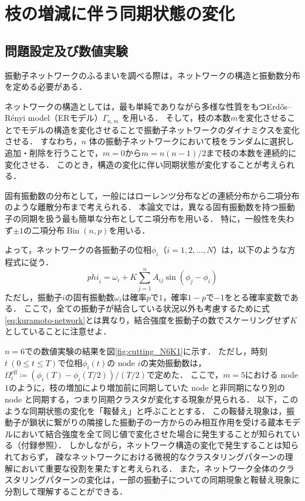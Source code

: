 \documentclass[../main]{subfiles}
\begin{document}
\chapter{枝の増減に伴う同期状態の変化}
\label{chap:method-3body}
\section{問題設定及び数値実験}
\label{sec:method-3body-settting}
振動子ネットワークのふるまいを調べる際は，ネットワークの構造と振動数分布を定める必要がある．

ネットワークの構造としては，最も単純でありながら多様な性質をもつErd\H{o}s–R\'{e}nyi model（ERモデル）$\Gamma_{n,m}$ を用いる．
そして，枝の本数$m$を変化させることでモデルの構造を変化させることで振動子ネットワークのダイナミクスを変化させる．
すなわち，$n$ 体の振動子ネットワークにおいて枝をランダムに選択し追加・削除を行うことで，$m=0$から$m=n(n-1)/2$まで枝の本数を連続的に変化させる．
このとき，構造の変化に伴い同期状態が変化することが考えられる．

固有振動数の分布として，一般にはローレンツ分布などの連続分布\cite{kuramoto1975}から二項分布のような離散分布\cite{1992BonillaNeuSpigler}まで考えられる．
本論文では，異なる固有振動数を持つ振動子の同期を扱う最も簡単な分布としてニ項分布を用いる．
特に，一般性を失わず$\pm 1$の二項分布$\operatorname{Bin}(n,p)$を用いる．

よって，ネットワークの各振動子の位相$\phi_i$（$i=1,2,\ldots,N$）は，以下のような方程式に従う．
\begin{equation}
    \dot{phi}_i=\omega_i+K\sum_{j=1}^n A_{ij}\sin(\phi_j-\phi_i)
\end{equation}
ただし，振動子$i$の固有振動数$\omega_i$は確率$p$で$1$，確率$1-p$で$-1$をとる確率変数である．
ここで，全ての振動子が結合している状況以外も考慮するために式\eqref{eq:kuramoto-network}とは異なり，結合強度を振動子の数でスケーリングせず$K$としていることに注意せよ．

$n=6$での数値実験の結果を図\ref{fig:cutting_N6K1}に示す．
ただし，時刻$t\ (0\leq t\leq T)$で位相$\phi_i(t)$の node $i$の実効振動数は，$\Omega_i^{\mathrm{eff}}\coloneqq(\phi_i(T)-\phi_i(T/2))/(T/2)$で定めた．
ここで，$m=5$における node $1$のように，枝の増加により増加前に同期していた node と非同期になり別の node と同期する，つまり同期クラスタが変化する現象が見られる．
以下，このような同期状態の変化を「鞍替え」と呼ぶこととする．
この鞍替え現象は，振動子が鎖状に繋がりの隣接した振動子の一方からのみ相互作用を受ける蔵本モデルにおいて結合強度を全て同じ値で変化させた場合に発生することが知られている\cite{XiaHuang:130506}（付録参照）．
しかしながら，ネットワーク構造の変化で発生することは知られておらず，
疎なネットワークにおける微視的なクラスタリングパターンの理解において重要な役割を果たすと考えられる．
また，ネットワーク全体のクラスタリングパターンの変化は，一部の振動子についての同期現象と鞍替え現象に分割して理解することができる．
\end{document}
